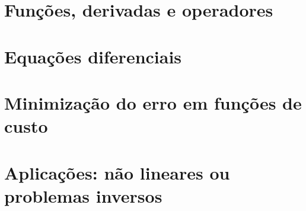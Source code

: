 \documentclass[12pt]{extbook} %
\def \SourceRootPath{.}
\begin{document}
\part{Funções, derivadas e operadores}





\part{Equações diferenciais}


\part{Minimização do erro em funções de custo}




\part{Aplicações: não lineares ou problemas inversos}



\end{document}
